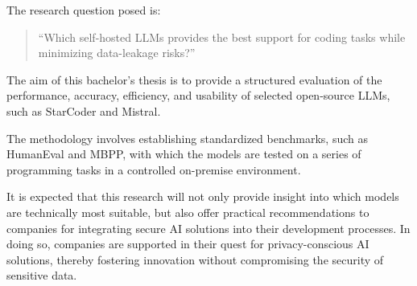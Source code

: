 The research question posed is:  
\begin{quote}
  “Which self-hosted \glspl{LLM} provides the best support for coding tasks while minimizing data-leakage risks?”
\end{quote}

The aim of this bachelor’s thesis is to provide a structured evaluation of the performance, accuracy, efficiency, and usability of selected open-source \glspl{LLM}, such as StarCoder and Mistral.

The methodology involves establishing standardized benchmarks, such as HumanEval and \gls{MBPP}, with which the models are tested on a series of programming tasks in a controlled on-premise environment.

It is expected that this research will not only provide insight into which models are technically most suitable, but also offer practical recommendations to companies for integrating secure \gls{AI} solutions into their development processes. In doing so, companies are supported in their quest for privacy-conscious \gls{AI} solutions, thereby fostering innovation without compromising the security of sensitive data.
